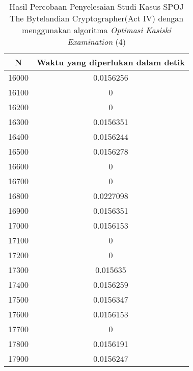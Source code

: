 \begin{table}[H]
\centering
\begin{tabular}{|c|c|}\hline
N&Waktu yang diperlukan dalam detik\\ \hline
16000&0.0156256\\ \hline
16100&0\\ \hline
16200&0\\ \hline
16300&0.0156351\\ \hline
16400&0.0156244\\ \hline
16500&0.0156278\\ \hline
16600&0\\ \hline
16700&0\\ \hline
16800&0.0227098\\ \hline
16900&0.0156351\\ \hline
17000&0.0156153\\ \hline
17100&0\\ \hline
17200&0\\ \hline
17300&0.015635\\ \hline
17400&0.0156259\\ \hline
17500&0.0156347\\ \hline
17600&0.0156153\\ \hline
17700&0\\ \hline
17800&0.0156191\\ \hline
17900&0.0156247\\ \hline
\end{tabular}
\caption {Hasil Percobaan Penyelesaian Studi Kasus SPOJ The Bytelandian Cryptographer(Act IV) dengan menggunakan algoritma \textit{Optimasi Kasiski Examination} (4)}
\label{tab:res8}
\end{table}
